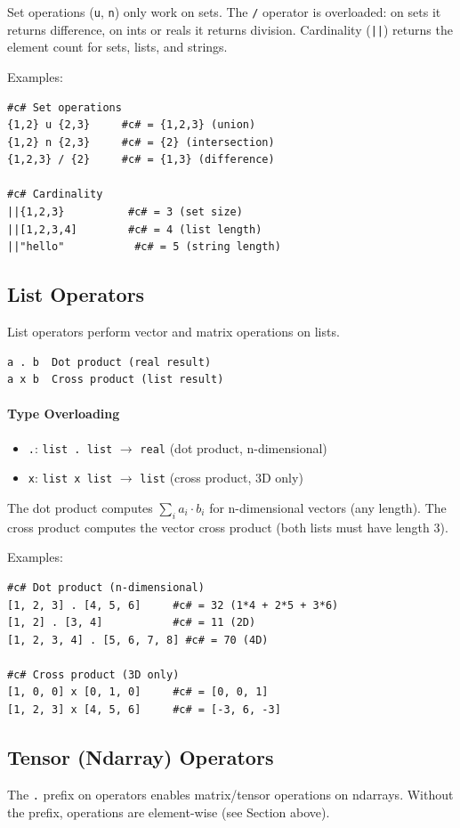 \documentclass{report}
\begin{document}
Set operations (\texttt{u}, \texttt{n}) only work on sets. The \texttt{/} operator is overloaded: on sets it returns difference, on ints or reals it returns division. Cardinality (\texttt{||}) returns the element count for sets, lists, and strings.

Examples:
\begin{verbatim}
#c# Set operations
{1,2} u {2,3}     #c# = {1,2,3} (union)
{1,2} n {2,3}     #c# = {2} (intersection)
{1,2,3} / {2}     #c# = {1,3} (difference)

#c# Cardinality
||{1,2,3}          #c# = 3 (set size)
||[1,2,3,4]        #c# = 4 (list length)
||"hello"           #c# = 5 (string length)
\end{verbatim}

\subsection{List Operators}
List operators perform vector and matrix operations on lists.
\begin{verbatim}
a . b  Dot product (real result)
a x b  Cross product (list result)
\end{verbatim}

\paragraph{Type Overloading}
\begin{itemize}
\item \texttt{.}: \texttt{list . list} $\rightarrow$ \texttt{real} (dot product, n-dimensional)
\item \texttt{x}: \texttt{list x list} $\rightarrow$ \texttt{list} (cross product, 3D only)
\end{itemize}

The dot product computes $\sum_{i} a_i \cdot b_i$ for n-dimensional vectors (any length). The cross product computes the vector cross product (both lists must have length 3).

Examples:
\begin{verbatim}
#c# Dot product (n-dimensional)
[1, 2, 3] . [4, 5, 6]     #c# = 32 (1*4 + 2*5 + 3*6)
[1, 2] . [3, 4]           #c# = 11 (2D)
[1, 2, 3, 4] . [5, 6, 7, 8] #c# = 70 (4D)

#c# Cross product (3D only)
[1, 0, 0] x [0, 1, 0]     #c# = [0, 0, 1]
[1, 2, 3] x [4, 5, 6]     #c# = [-3, 6, -3]
\end{verbatim}

\subsection{Tensor (Ndarray) Operators}
The \texttt{.} prefix on operators enables matrix/tensor operations on ndarrays. Without the prefix, operations are element-wise (see Section above).
\end{document}
